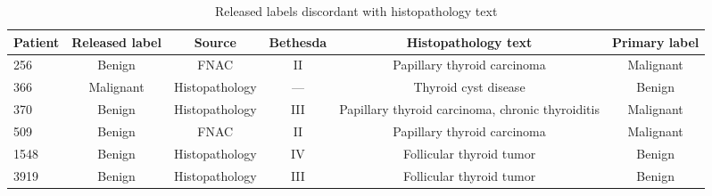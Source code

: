 \begin{table}[htbp]
\caption{Released labels discordant with histopathology text}\label{tab:s2_label_discordance}
\scriptsize
\begin{tabular*}{\textwidth}{@{\extracolsep{\fill}}lccccc@{}}
\toprule
Patient & Released label & Source & Bethesda & Histopathology text & Primary label \\
\midrule
256 & Benign & FNAC & II & Papillary thyroid carcinoma & Malignant \\
366 & Malignant & Histopathology & --- & Thyroid cyst disease & Benign \\
370 & Benign & Histopathology & III & Papillary thyroid carcinoma, chronic thyroiditis & Malignant \\
509 & Benign & FNAC & II & Papillary thyroid carcinoma & Malignant \\
1548 & Benign & Histopathology & IV & Follicular thyroid tumor & Benign \\
3919 & Benign & Histopathology & III & Follicular thyroid tumor & Benign \\
\bottomrule
\end{tabular*}
\smallskip{}
\end{table}

